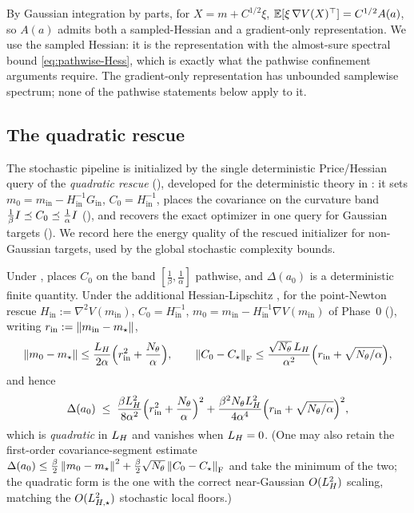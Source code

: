 \begin{remark}
\label{rem:price}
By Gaussian integration by parts, for $X=m+C^{1/2}\xi$, $\mathbb{E}[\xi\,\nabla V(X)^\top]=C^{1/2}A(a)$, so
$A(a)$ admits both a sampled-Hessian and a gradient-only representation. We use the sampled Hessian:
it is the representation with the almost-sure spectral bound \eqref{eq:pathwise-Hess}, which is
exactly what the pathwise confinement arguments require. The gradient-only representation has
unbounded samplewise spectrum; none of the pathwise statements below apply to it.
\end{remark}

\subsection{The quadratic rescue}
\label{subsec:rescue}

The stochastic pipeline is initialized by the single deterministic Price/Hessian query of the
\emph{quadratic rescue} (), developed for the deterministic theory in
: it sets $m_0=m_{\mathrm{in}}-H_{\mathrm{in}}^{-1}G_{\mathrm{in}}$,
$C_0=H_{\mathrm{in}}^{-1}$, places the covariance on the curvature band
$\tfrac1\beta I\preceq C_0\preceq\tfrac1\alpha I$ (), and recovers the exact
optimizer in one query for Gaussian targets (). We record here the energy
quality of the rescued initializer for non-Gaussian targets, used by the global stochastic
complexity bounds.

\begin{lemma}
\label{lem:rescue-energy}
Under ,  places $C_0$ on the band
$[\tfrac1\beta,\tfrac1\alpha]$ pathwise, and $\Delta(a_0)$ is a deterministic finite quantity. Under
the additional Hessian-Lipschitz , for the point-Newton rescue
$H_{\mathrm{in}}:=\nabla^2V(m_{\mathrm{in}})$, $C_0=H_{\mathrm{in}}^{-1}$,
$m_0=m_{\mathrm{in}}-H_{\mathrm{in}}^{-1}\nabla V(m_{\mathrm{in}})$ of Phase~0
(), writing $r_{\mathrm{in}}:=\left\lVert m_{\mathrm{in}}-m_\star\right\rVert$,
\[
    \left\lVert m_0-m_\star\right\rVert\leq\frac{L_H}{2\alpha}\Bigl(r_{\mathrm{in}}^2+\frac{N_\theta}\alpha\Bigr),
    \qquad
    \left\lVert C_0-C_\star\right\rVert_{\mathrm{F}}\leq\frac{\sqrt{N_\theta}\,L_H}{\alpha^2}\Bigl(r_{\mathrm{in}}+\sqrt{N_\theta/\alpha}\Bigr),
\]
and hence
\[
    \Delta(a_0)
    \;\leq\;
    \frac{\beta L_H^2}{8\alpha^2}\Bigl(r_{\mathrm{in}}^2+\frac{N_\theta}\alpha\Bigr)^2
    +\frac{\beta^2N_\theta L_H^2}{4\alpha^4}\Bigl(r_{\mathrm{in}}+\sqrt{N_\theta/\alpha}\Bigr)^2,
\]
which is \emph{quadratic} in $L_H$ and vanishes when $L_H=0$. (One may also retain the first-order
covariance-segment estimate
$\Delta(a_0)\leq\tfrac\beta2\left\lVert m_0-m_\star\right\rVert^2+\tfrac\beta2\sqrt{N_\theta}\left\lVert C_0-C_\star\right\rVert_{\mathrm{F}}$
and take the minimum of the two; the quadratic form is the one with the correct near-Gaussian
$O(L_H^2)$ scaling, matching the $O(L_{H,\star}^2)$ stochastic local floors.)
\end{lemma}

